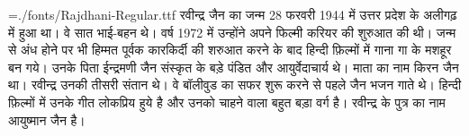 
\nopagenumbers
\parindent=0mm
\font\raj={./fonts/Rajdhani-Regular.ttf}
\raj
रवीन्द्र जैन का जन्म 28 फरवरी 1944 में उत्तर प्रदेश के अलीगढ़ में हुआ था। वे सात भाई-बहन थे। वर्ष 1972 में उन्होंने अपने फिल्मी करियर की शुरुआत की थी। जन्म से अंध होने पर भी हिम्मत पूर्वक कारकिर्दी की शरुआत करने के बाद हिन्दी फ़िल्मों में गाना गा के मशहूर बन गये। उनके पिता ईन्द्रमणी जैन संस्कृत के बड़े पंडित और आयुर्वेदाचार्य थे। माता का नाम किरन जैन था। रवीन्द्र उनकी तीसरी संतान थे। वे बॉलीवुड का सफर शुरू करने से पहले जैन भजन गाते थे। हिन्दी फ़िल्मों में उनके गीत लोकप्रिय हुये है और उनको चाहने वाला बहुत बड़ा वर्ग है। रवीन्द्र के पुत्र का नाम आयुष्मान जैन है।
\bye
